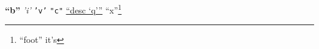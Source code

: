 \documentclass[11pt]{article}
\author{Au}
\date{2026-01-01}
\title{}
\begin{document}
\tableofcontents

\textbf{``b''} \emph{'i'} \texttt{'v'} \texttt{"c"} \href{http://x.org}{``desc `q'''} ``x''\footnote{``foot'' it's}
\end{document}
